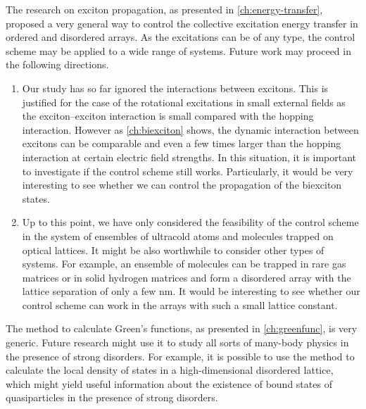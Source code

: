 The research on exciton propagation, as presented in \autoref{ch:energy-transfer}, proposed a very general way to control
the collective excitation energy transfer in ordered and disordered arrays. As the excitations can be of any type, the control 
scheme may be applied to a wide range of systems. Future work may proceed in the following directions.
\begin{enumerate}
%
\item Our study has so far ignored the interactions between excitons. This is justified for the case of the rotational 
excitations in small external fields as the exciton--exciton interaction is small compared with the hopping interaction. 
However as \autoref{ch:biexciton} shows, the dynamic interaction between excitons can be comparable and even a few 
times larger than the hopping interaction at certain electric field strengths. In this situation, it is important to investigate
 if the control scheme still works. Particularly, it would be very interesting to see whether we can control the propagation
 of the biexciton states. 
%
\item Up to this point, we have only considered the feasibility of the control scheme in the system of ensembles of ultracold
 atoms and molecules trapped on optical lattices. It might be also worthwhile to consider other types of systems. For 
 example, an ensemble of molecules can be trapped in rare gas matrices or in solid hydrogen matrices and form a disordered array with the lattice separation of only a few nm. It would be interesting to see whether our control scheme
 can work in the arrays with such a small lattice constant. 
\end{enumerate}

The method to calculate Green's functions, as presented in \autoref{ch:greenfunc}, is very generic. Future research might
use it to study all sorts of many-body physics in the presence of strong disorders. For example, it is possible to
use the method to calculate the local density of states in a  high-dimensional disordered lattice, which might yield useful information about the 
existence of bound states of quasiparticles in the presence of strong disorders. 


 